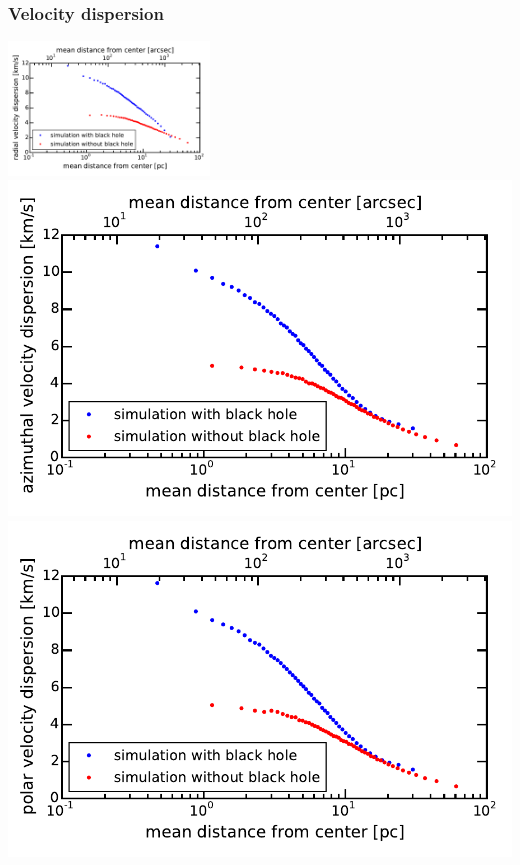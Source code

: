 \documentclass[a4paper,12pt,abstracton]{scrartcl}
\begin{document}
\subsubsection{Velocity dispersion}
\includegraphics[width=0.4\textwidth]{Plots/radial_velocity_dispersion.pdf}\\
\includegraphics{Plots/azimuthal_velocity_dispersion.pdf}\\
\includegraphics{Plots/polar_velocity_dispersion.pdf}\\
\end{document}
